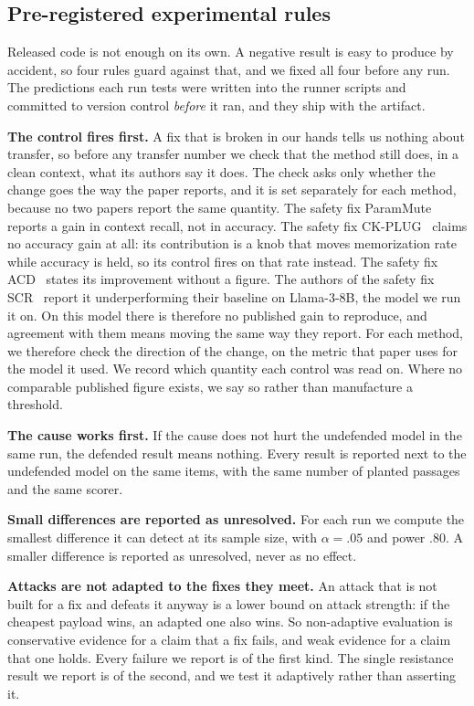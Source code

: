 \subsection{Pre-registered experimental rules}

Released code is not enough on its own. A negative result is easy to produce
by accident, so four rules guard against that, and we fixed all four before
any run. The predictions each run tests were written into the runner scripts and
committed to version control \emph{before} it ran, and they ship with the
artifact.

\textbf{The control fires first.} A fix that is broken in our hands
tells us nothing about transfer, so before any transfer number we check that
the method still does, in a clean context, what its authors say it does. The check asks only whether the change goes the way the paper reports,
and it is set separately for each method, because no two papers report the
same quantity. The safety fix ParamMute~\cite{huang-2025-parammute} reports a gain in context
recall, not in accuracy. The safety fix CK-PLUG~\cite{bi-2025-parameters} claims no accuracy gain at all: its
contribution is a knob that moves memorization rate while accuracy is held,
so its control fires on that rate instead. The safety fix ACD~\cite{kim-2024-adaptive} states its improvement
without a figure. The authors of the safety fix SCR~\cite{huang-2024-trust} report it underperforming their
baseline on Llama-3-8B, the model we run it on. On this model there is therefore no
published gain to reproduce, and agreement with them means moving the same
way they report. For each method, we therefore check the direction of the change, on the metric
that paper uses for the model it used. We record which quantity each
control was read on. Where no comparable published figure
exists, we say so rather than manufacture a threshold.


\textbf{The cause works first.} If the cause does not hurt the undefended
model in the same run, the defended result means nothing. Every result is
reported next to the undefended model on the same items, with the same number
of planted passages and the same scorer.

\textbf{Small differences are reported as unresolved.} For each run we
compute the smallest difference it can detect at its sample size, with
$\alpha = .05$ and power $.80$. A smaller difference is reported as
unresolved, never as no effect.


\textbf{Attacks are not adapted to the fixes they meet.} An attack that is not built for a fix and
defeats it anyway is a lower bound on attack strength: if the
cheapest payload wins, an adapted one also wins. So non-adaptive evaluation is
conservative evidence for a claim that a fix fails, and weak evidence for
a claim that one holds. Every failure we report is of the first kind. The single resistance
result we report is of the second, and we test it adaptively rather than
asserting it.
